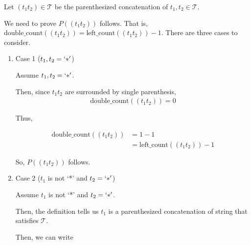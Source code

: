 \documentclass[12pt]{article}
\begin{document}
\begin{enumerate}[a.]
\begin{mdframed}
\begin{enumerate}[1.]
\begin{mdframed}
        Let $(t_1t_2) \in \mathcal{T}$ be the parenthesized concatenation of $t_1,t_2 \in \mathcal{T}$.

        \bigskip

        We need to prove $P((t_1t_2))$ follows. That is, $\text{double\_count}((t_1t_2)) = \text{left\_count}((t_1t_2)) - 1$.
        There are three cases to consider.

        \bigskip

        \begin{enumerate}[1.]
            \item Case 1 ($t_1,t_2 = `*'$)

            \begin{mdframed}
            Assume $t_1,t_2 = `*'$.

            \bigskip

            Then, since $t_1t_2$ are surrounded by single parenthesis,
            \setcounter{equation}{0}
            \begin{align}
                \text{double\_count}((t_1t_2)) = 0
            \end{align}

            \bigskip

            Thus,

            \begin{align}
                \text{double\_count}((t_1t_2)) &= 1 - 1\\
                &= \text{left\_count}((t_1t_2)) - 1
            \end{align}

            \bigskip

            So, $P((t_1t_2))$ follows.

            \end{mdframed}

            \item Case 2 ($t_1$ is not `*' and $t_2 = `*'$)

            \begin{mdframed}
            Assume $t_1$ is not `*' and $t_2 = `*'$.

            \bigskip

            Then, the definition tells us $t_1$ is a parenthesized
            concatenation of string that satisfies $\mathcal{T}$.

            \bigskip

            Then, we can write

            \bigskip


\end{mdframed}
\end{enumerate}
\end{mdframed}
\end{enumerate}
\end{mdframed}
\end{enumerate}
\end{document}
